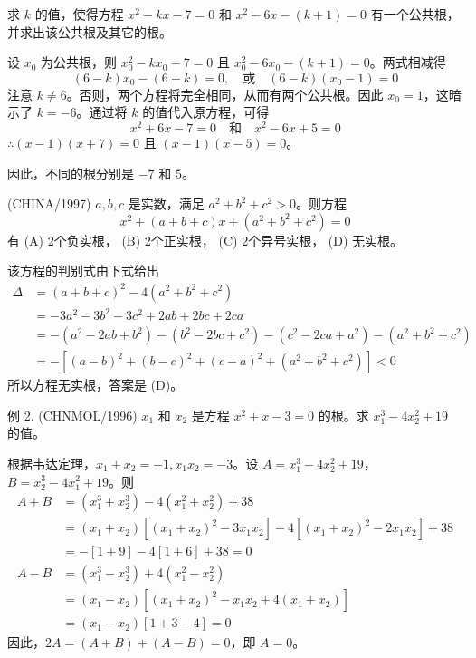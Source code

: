 \begin{questions}
\question 求 $k$ 的值，使得方程 $x^2 - kx - 7 = 0$ 和 $x^2 - 6x - (k + 1) = 0$ 有一个公共根，并求出该公共根及其它的根。

\begin{solution}
设 $x_0$ 为公共根，则 $x_0^2 - kx_0 - 7 = 0$ 且 $x_0^2 - 6x_0 - (k + 1) = 0$。两式相减得
\[
(6 - k)x_0 - (6 - k) = 0, \quad \text{或} \quad (6 - k)(x_0 - 1) = 0
\]
注意 $k \neq 6$。否则，两个方程将完全相同，从而有两个公共根。因此 $x_0 = 1$，这暗示了 $k = -6$。通过将 $k$ 的值代入原方程，可得
\[
x^2 + 6x - 7 = 0 \quad \text{和} \quad x^2 - 6x + 5 = 0
\]
$\therefore (x - 1)(x + 7) = 0$ 且 $(x - 1)(x - 5) = 0$。

因此，不同的根分别是 $-7$ 和 $5$。
\end{solution}

\question (CHINA/1997) $a, b, c$ 是实数，满足 $a^2 + b^2 + c^2 > 0$。则方程
\[
x^2 + (a + b + c)x + (a^2 + b^2 + c^2) = 0
\]
有
(A) 2个负实根， (B) 2个正实根，
(C) 2个异号实根， (D) 无实根。

\begin{solution}
该方程的判别式由下式给出
\begin{align*}
\Delta &= (a + b + c)^2 - 4(a^2 + b^2 + c^2) \\
&= -3a^2 - 3b^2 - 3c^2 + 2ab + 2bc + 2ca \\
&= -(a^2 - 2ab + b^2) - (b^2 - 2bc + c^2) - (c^2 - 2ca + a^2) - (a^2 + b^2 + c^2) \\
&= -\left[ (a - b)^2 + (b - c)^2 + (c - a)^2 + (a^2 + b^2 + c^2) \right] < 0
\end{align*}
所以方程无实根，答案是 (D)。
\end{solution}

\question 例 2. (CHNMOL/1996) $x_1$ 和 $x_2$ 是方程 $x^2 + x - 3 = 0$ 的根。求 $x_1^3 - 4x_2^2 + 19$ 的值。

\begin{solution}
根据韦达定理，$x_1 + x_2 = -1, x_1x_2 = -3$。设 $A = x_1^3 - 4x_2^2 + 19$，$B = x_2^3 - 4x_1^2 + 19$。则
\begin{align*}
A + B &= (x_1^3 + x_2^3) - 4(x_1^2 + x_2^2) + 38 \\
&= (x_1 + x_2)\left[(x_1 + x_2)^2 - 3x_1x_2\right] - 4\left[(x_1 + x_2)^2 - 2x_1x_2\right] + 38 \\
&= -[1 + 9] - 4[1 + 6] + 38 = 0 \\
A - B &= (x_1^3 - x_2^3) + 4(x_1^2 - x_2^2) \\
&= (x_1 - x_2)\left[(x_1 + x_2)^2 - x_1x_2 + 4(x_1 + x_2)\right] \\
&= (x_1 - x_2)[1 + 3 - 4] = 0
\end{align*}
因此，$2A = (A + B) + (A - B) = 0$，即 $A = 0$。
\end{solution}


\end{questions}
